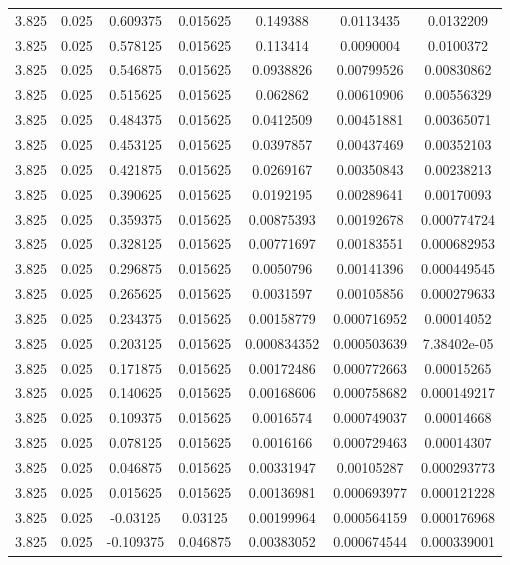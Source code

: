 \begin{flushleft}
\begin{longtable}{ccccccc}
3.825 & 0.025 & 0.609375 & 0.015625 & 0.149388 & 0.0113435 & 0.0132209  \\ 
3.825 & 0.025 & 0.578125 & 0.015625 & 0.113414 & 0.0090004 & 0.0100372  \\ 
3.825 & 0.025 & 0.546875 & 0.015625 & 0.0938826 & 0.00799526 & 0.00830862  \\ 
3.825 & 0.025 & 0.515625 & 0.015625 & 0.062862 & 0.00610906 & 0.00556329  \\ 
3.825 & 0.025 & 0.484375 & 0.015625 & 0.0412509 & 0.00451881 & 0.00365071  \\ 
3.825 & 0.025 & 0.453125 & 0.015625 & 0.0397857 & 0.00437469 & 0.00352103  \\ 
3.825 & 0.025 & 0.421875 & 0.015625 & 0.0269167 & 0.00350843 & 0.00238213  \\ 
3.825 & 0.025 & 0.390625 & 0.015625 & 0.0192195 & 0.00289641 & 0.00170093  \\ 
3.825 & 0.025 & 0.359375 & 0.015625 & 0.00875393 & 0.00192678 & 0.000774724  \\ 
3.825 & 0.025 & 0.328125 & 0.015625 & 0.00771697 & 0.00183551 & 0.000682953  \\ 
3.825 & 0.025 & 0.296875 & 0.015625 & 0.0050796 & 0.00141396 & 0.000449545  \\ 
3.825 & 0.025 & 0.265625 & 0.015625 & 0.0031597 & 0.00105856 & 0.000279633  \\ 
3.825 & 0.025 & 0.234375 & 0.015625 & 0.00158779 & 0.000716952 & 0.00014052  \\ 
3.825 & 0.025 & 0.203125 & 0.015625 & 0.000834352 & 0.000503639 & 7.38402e-05  \\ 
3.825 & 0.025 & 0.171875 & 0.015625 & 0.00172486 & 0.000772663 & 0.00015265  \\ 
3.825 & 0.025 & 0.140625 & 0.015625 & 0.00168606 & 0.000758682 & 0.000149217  \\ 
3.825 & 0.025 & 0.109375 & 0.015625 & 0.0016574 & 0.000749037 & 0.00014668  \\ 
3.825 & 0.025 & 0.078125 & 0.015625 & 0.0016166 & 0.000729463 & 0.00014307  \\ 
3.825 & 0.025 & 0.046875 & 0.015625 & 0.00331947 & 0.00105287 & 0.000293773  \\ 
3.825 & 0.025 & 0.015625 & 0.015625 & 0.00136981 & 0.000693977 & 0.000121228  \\ 
3.825 & 0.025 & -0.03125 & 0.03125 & 0.00199964 & 0.000564159 & 0.000176968  \\ 
3.825 & 0.025 & -0.109375 & 0.046875 & 0.00383052 & 0.000674544 & 0.000339001  \\ 

\end{longtable}
\end{flushleft}
